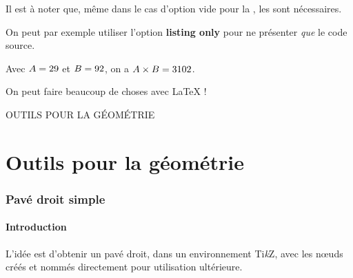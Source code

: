 \documentclass[a4paper,french,11pt]{article}
\providecommand\tikzlogo{Ti\textit{k}Z}
\let\TikZ\tikzlogo
\newcommand\ctex[1]{\tcbox[vignettelatex]{#1}}
\newcommand\Cle[1]{{\bfseries\sffamily\textlangle #1\textrangle}}
\begin{document}
\begin{noteblock}
Il est à noter que, même dans le cas d'option vide pour la \ctex{tcolorbox}, les \ctex{\{\}} sont nécessaires.

\smallskip

On peut par exemple utiliser l'option \Cle{listing only} pour ne présenter \textit{que} le code source.
\end{noteblock}

\begin{PresCodePL}{}
\begin{PresentationCode}{}
\xdef\ValAleaA{\fpeval{randint(1,100)}}
\xdef\ValAleaB{\fpeval{randint(1,100)}}

Avec $A=\ValAleaA$ et $B=\ValAleaB$, on a $A\times B=\inteval{\ValAleaA * \ValAleaB}$.
\end{PresentationCode}

\begin{PresentationCode}[DarkBlue]{}
On peut faire beaucoup de choses avec \LaTeX{} !
\end{PresentationCode}
\end{PresCodePL}

\pagebreak

\phantom{t}\par\vfill\par
\begin{PART}
	\begin{center}
		\Huge\MakeUppercase{Outils pour la géométrie}
	\end{center}
\end{PART}
\par\vfill\par\phantom{t}

\newpage

\part{Outils pour la géométrie}

\section{Pavé droit \og simple \fg}\label{pave}

\subsection{Introduction}

\begin{tipblock}
L'idée est d'obtenir un pavé droit, dans un environnement \TikZ, avec les nœuds créés et nommés directement pour utilisation ultérieure.
\end{tipblock}
\end{document}
